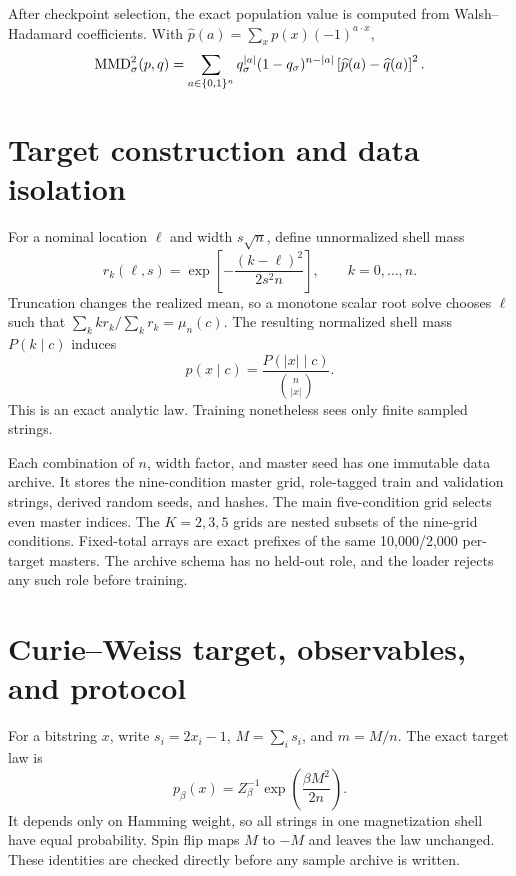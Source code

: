 After checkpoint selection, the exact population value is computed from
Walsh--Hadamard coefficients.  With $\widehat p(a)=\sum_xp(x)(-1)^{a\cdot x}$,
\begin{equation}
 \operatorname{MMD}_\sigma^2(p,q)=\sum_{a\in\{0,1\}^n}
 q_\sigma^{|a|}(1-q_\sigma)^{n-|a|}
 \left[\widehat p(a)-\widehat q(a)\right]^2.
\end{equation}

\section{Target construction and data isolation}
\label{app:data}

For a nominal location $\ell$ and width $s\sqrt n$, define unnormalized shell
mass
\begin{equation}
 r_k(\ell,s)=\exp\left[-\frac{(k-\ell)^2}{2s^2n}\right],
 \qquad k=0,\ldots,n.
\end{equation}
Truncation changes the realized mean, so a monotone scalar root solve chooses
$\ell$ such that $\sum_kk r_k/\sum_kr_k=\mu_n(c)$.  The resulting normalized
shell mass $P(k\mid c)$ induces
\begin{equation}
 p(x\mid c)=\frac{P(|x|\mid c)}{\binom n{|x|}}.
\end{equation}
This is an exact analytic law.  Training nonetheless sees only finite sampled
strings.

Each combination of $n$, width factor, and master seed has one immutable data
archive.  It stores the nine-condition master grid, role-tagged train and
validation strings, derived random seeds, and hashes.  The main five-condition
grid selects even master indices.  The $K=2,3,5$ grids are nested subsets of
the nine-grid conditions.  Fixed-total arrays are exact prefixes of the same
10,000/2,000 per-target masters.  The archive schema has no held-out role, and
the loader rejects any such role before training.

\section{Curie--Weiss target, observables, and protocol}
\label{app:curie-weiss}

For a bitstring $x$, write $s_i=2x_i-1$, $M=\sum_i s_i$, and $m=M/n$.
The exact target law is
\begin{equation}
 p_\beta(x)=Z_\beta^{-1}\exp\!\left(\frac{\beta M^2}{2n}\right).
\end{equation}
It depends only on Hamming weight, so all strings in one magnetization shell
have equal probability.  Spin flip maps $M$ to $-M$ and leaves the law
unchanged.  These identities are checked directly before any sample archive
is written.

